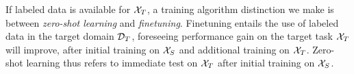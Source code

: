 If labeled data is available for $\mathcal{X}_T$, a training algorithm distinction we make is between \emph{zero-shot learning} and \emph{finetuning}. Finetuning entails the use of labeled data in the target domain $\mathcal{D}_T$, foreseeing performance gain on the target task $\mathcal{X}_T$ will improve, after initial training on $\mathcal{X}_S$ and additional training on $\mathcal{X}_T$. Zero-shot learning thus refers to immediate test on $\mathcal{X}_T$ after initial training on $\mathcal{X}_S$.